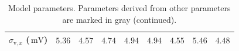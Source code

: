 \documentclass[10pt,a4paper,twoside,american]{article}
\theoremstyle{definitionstyle}
\newcommand{\mV}{\,\text{mV}}
\begin{document}
\begin{table}[H]
\begin{tabular}
{\begin{tabular}{|p{14ex}|>{\raggedleft}p{7ex}|>{\raggedleft}p{7ex}|>{\raggedleft}p{7ex}|>{\raggedleft}p{7ex}|>{\raggedleft}p{7ex}|>{\raggedleft}p{7ex}|>{\raggedleft}p{7ex}|>{\raggedleft\arraybackslash}p{7ex}|}
        \hline
	\vspace{-1ex} $\sigma_{\text{v}, x}$ ($\mV$) & \vspace{-1ex} $5.36$ & \vspace{-1ex} $4.57$ & \vspace{-1ex} $4.74$ & \vspace{-1ex} $4.94$ & \vspace{-1ex} $4.94$ & \vspace{-1ex} $4.55$ & \vspace{-1ex} $5.46$ & \vspace{-1ex} $4.48$\\
        \hline
\end{tabular}
}\\[6ex]
\hline
\end{tabular}
\caption{Model parameters. Parameters derived from other parameters are marked in gray (continued).}
\end{table}
\clearpage
\renewcommand{\appendixtocname}{Appendix}
\renewcommand{\appendixpagename}{Appendix}
\renewcommand{\appendixname}{}
\end{document}
